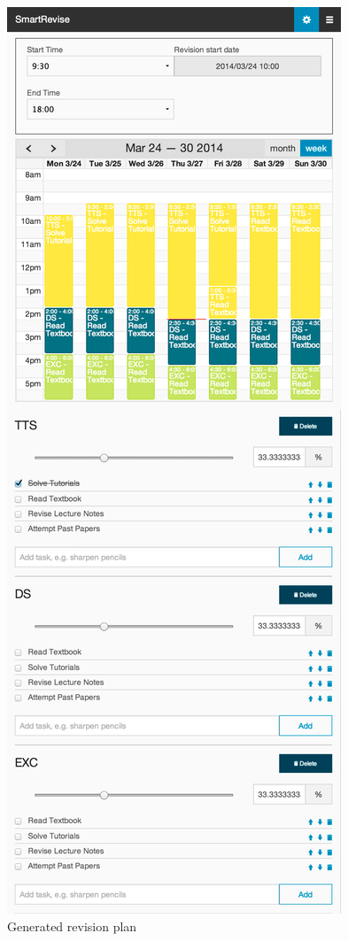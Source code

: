 \documentclass[bsc,frontabs,twoside,singlespacing,parskip]{infthesis}     %
\begin{document}
			\begin{figure}[p]
			    \centering
				\includegraphics[height=\textheight]{result}
			    \caption{Generated revision plan}
			    \label{fig:result}
			\end{figure}
\end{document}
